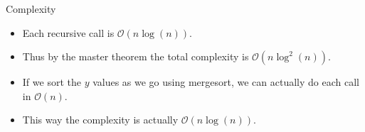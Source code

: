 \documentclass{beamer}
\begin{document}
\begin{frame}[plain]{Complexity}
	\begin{itemize}
        \item Each recursive call is $\mathcal{O}(n\log(n))$. 
        \item Thus by the master theorem the total complexity is $\mathcal{O}(n\log^2(n))$.
        \item If we sort the $y$ values as we go using mergesort, we can actually do each call in $\mathcal{O}(n)$.
        \item This way the complexity is actually $\mathcal{O}(n\log(n))$.
    \end{itemize}
\end{frame}
\end{document}
